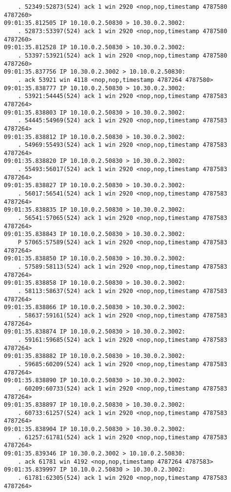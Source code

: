 \documentclass[a4paper,12pt]{article}
\begin{document}
\begin{Verbatim}
    . 52349:52873(524) ack 1 win 2920 <nop,nop,timestamp 4787580 4787260>
09:01:35.812505 IP 10.10.0.2.50830 > 10.30.0.2.3002: 
    . 52873:53397(524) ack 1 win 2920 <nop,nop,timestamp 4787580 4787260>
09:01:35.812528 IP 10.10.0.2.50830 > 10.30.0.2.3002: 
    . 53397:53921(524) ack 1 win 2920 <nop,nop,timestamp 4787580 4787260>
09:01:35.837756 IP 10.30.0.2.3002 > 10.10.0.2.50830: 
    . ack 53921 win 4118 <nop,nop,timestamp 4787264 4787580>
09:01:35.838777 IP 10.10.0.2.50830 > 10.30.0.2.3002: 
    . 53921:54445(524) ack 1 win 2920 <nop,nop,timestamp 4787583 4787264>
09:01:35.838803 IP 10.10.0.2.50830 > 10.30.0.2.3002: 
    . 54445:54969(524) ack 1 win 2920 <nop,nop,timestamp 4787583 4787264>
09:01:35.838812 IP 10.10.0.2.50830 > 10.30.0.2.3002: 
    . 54969:55493(524) ack 1 win 2920 <nop,nop,timestamp 4787583 4787264>
09:01:35.838820 IP 10.10.0.2.50830 > 10.30.0.2.3002: 
    . 55493:56017(524) ack 1 win 2920 <nop,nop,timestamp 4787583 4787264>
09:01:35.838827 IP 10.10.0.2.50830 > 10.30.0.2.3002: 
    . 56017:56541(524) ack 1 win 2920 <nop,nop,timestamp 4787583 4787264>
09:01:35.838835 IP 10.10.0.2.50830 > 10.30.0.2.3002: 
    . 56541:57065(524) ack 1 win 2920 <nop,nop,timestamp 4787583 4787264>
09:01:35.838843 IP 10.10.0.2.50830 > 10.30.0.2.3002: 
    P 57065:57589(524) ack 1 win 2920 <nop,nop,timestamp 4787583 4787264>
09:01:35.838850 IP 10.10.0.2.50830 > 10.30.0.2.3002: 
    . 57589:58113(524) ack 1 win 2920 <nop,nop,timestamp 4787583 4787264>
09:01:35.838858 IP 10.10.0.2.50830 > 10.30.0.2.3002: 
    . 58113:58637(524) ack 1 win 2920 <nop,nop,timestamp 4787583 4787264>
09:01:35.838866 IP 10.10.0.2.50830 > 10.30.0.2.3002: 
    . 58637:59161(524) ack 1 win 2920 <nop,nop,timestamp 4787583 4787264>
09:01:35.838874 IP 10.10.0.2.50830 > 10.30.0.2.3002: 
    . 59161:59685(524) ack 1 win 2920 <nop,nop,timestamp 4787583 4787264>
09:01:35.838882 IP 10.10.0.2.50830 > 10.30.0.2.3002: 
    . 59685:60209(524) ack 1 win 2920 <nop,nop,timestamp 4787583 4787264>
09:01:35.838890 IP 10.10.0.2.50830 > 10.30.0.2.3002: 
    . 60209:60733(524) ack 1 win 2920 <nop,nop,timestamp 4787583 4787264>
09:01:35.838897 IP 10.10.0.2.50830 > 10.30.0.2.3002: 
    . 60733:61257(524) ack 1 win 2920 <nop,nop,timestamp 4787583 4787264>
09:01:35.838904 IP 10.10.0.2.50830 > 10.30.0.2.3002: 
    . 61257:61781(524) ack 1 win 2920 <nop,nop,timestamp 4787583 4787264>
09:01:35.839346 IP 10.30.0.2.3002 > 10.10.0.2.50830: 
    . ack 61781 win 4192 <nop,nop,timestamp 4787264 4787583>
09:01:35.839997 IP 10.10.0.2.50830 > 10.30.0.2.3002: 
    . 61781:62305(524) ack 1 win 2920 <nop,nop,timestamp 4787583 4787264>

\end{Verbatim}
\end{document}

